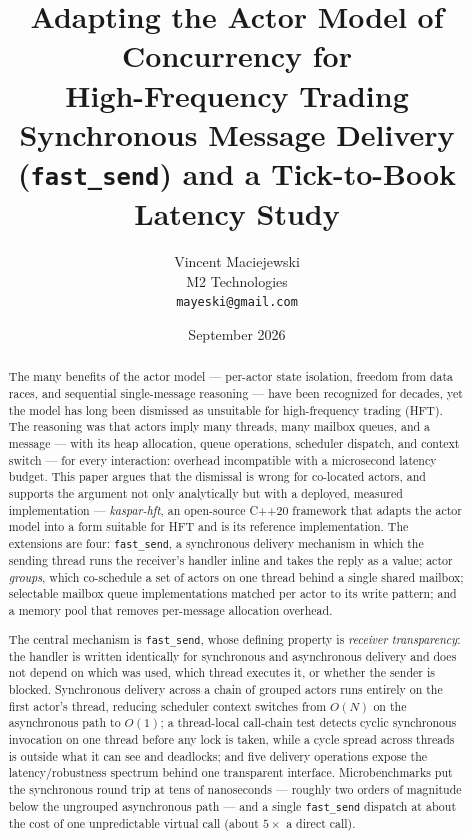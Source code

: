 \documentclass[11pt]{article}
\title{\textbf{Adapting the Actor Model of Concurrency for\\
High-Frequency Trading}\\
\large Synchronous Message Delivery (\texttt{fast\_send}) and a Tick-to-Book Latency Study}
\author{%
  Vincent Maciejewski\\
  \small M2 Technologies\\
  \small \texttt{mayeski@gmail.com}
}
\date{September 2026}
\newcommand{\fs}{\texttt{fast\_send}}
\begin{document}
\maketitle

\begin{abstract}
The many benefits of the actor model --- per-actor state isolation, freedom
from data races, and sequential single-message reasoning --- have been
recognized for decades, yet the model has
long been dismissed as unsuitable for high-frequency trading (HFT). 
The reasoning was that actors imply many
threads, many mailbox queues, and a message --- with its heap allocation, queue
operations, scheduler dispatch, and context switch --- for every interaction:
overhead incompatible with a microsecond latency budget. This paper argues that
the dismissal is wrong for co-located actors, and supports the argument not only
analytically but with a deployed, measured implementation --- \emph{kaspar-hft},
an open-source C++20 framework that adapts the actor model into a form suitable
for HFT and is its reference implementation. The extensions are four: \fs{}, a
synchronous delivery
mechanism in which the sending thread runs the receiver's handler inline and
takes the reply as a value; actor \emph{groups}, which co-schedule a set of actors
on one thread behind a single shared mailbox; selectable mailbox queue
implementations matched per actor to its write pattern; and a memory pool that
removes per-message allocation overhead.

The central mechanism is \fs{}, whose defining property is \emph{receiver
transparency}: the handler is written identically for synchronous and
asynchronous delivery and does not depend on which was used, which thread
executes it, or whether the sender is blocked. Synchronous delivery
across a chain of grouped actors runs entirely on the first actor's thread,
reducing scheduler context switches from $O(N)$ on the asynchronous path to
$O(1)$; a thread-local call-chain test detects cyclic synchronous invocation on
one thread before any lock is taken, while a cycle spread across threads is
outside what it can see and deadlocks; and five delivery operations expose the
latency/robustness spectrum behind one transparent interface. Microbenchmarks put
the synchronous round trip at tens of nanoseconds --- roughly two orders of
magnitude below the ungrouped asynchronous path --- and a single \fs{} dispatch at
about the cost of one unpredictable virtual call (about $5\times$ a direct call).


\end{abstract}
\end{document}

